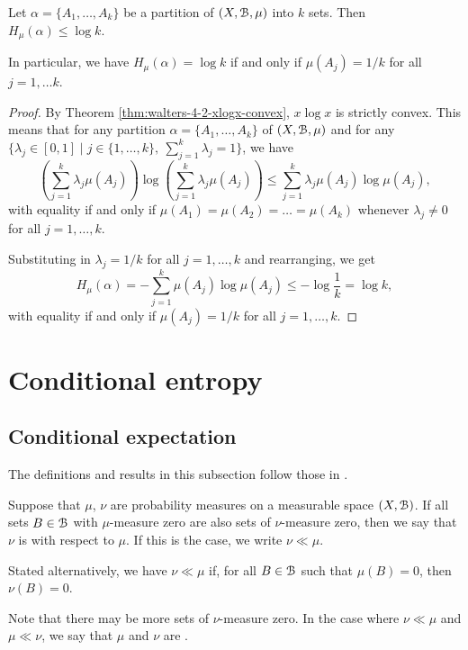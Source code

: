 \begin{proposition} \label{prop:walters-cor-4-2-1}
	Let $\alpha = \{A_1, \dots, A_k\}$ be a partition of $(X, \mathcal{B}, \mu)$ into $k$ sets. Then $H_\mu(\alpha) \leq \log{k}$.
	
	In particular, we have $H_\mu(\alpha) = \log{k}$ if and only if $\mu(A_j) = 1 / k$ for all $j = 1, \dots k$.
	
	\begin{proof}
		By Theorem \ref{thm:walters-4-2-xlogx-convex}, $x \log{x}$ is strictly convex. This means that for any partition $\alpha = \{A_1, \dots, A_k\}$ of $(X, \mathcal{B}, \mu)$ and for any $\{\lambda_j \in [0, 1] \mid j \in \{1, \dots, k\},\ \sum_{j = 1}^k{\lambda_j} = 1\}$, we have
		\[
			\left(\sum_{j = 1}^k{\lambda_j \mu(A_j)}\right) \log{\left(\sum_{j = 1}^k{\lambda_j \mu(A_j)}\right)} \leq \sum_{j = 1}^k{\lambda_j \mu(A_j) \log{\mu(A_j)}},
		\]
		with equality if and only if $\mu(A_1) = \mu(A_2) = \dots = \mu(A_k)$ whenever $\lambda_j \neq 0$ for all $j = 1, \dots, k$.
		
		Substituting in $\lambda_j = 1 / k$ for all $j = 1, \dots, k$ and rearranging, we get
		\[
			H_\mu(\alpha) = -\sum_{j = 1}^k{\mu(A_j) \log{\mu(A_j)}} \leq -\log{\frac{1}{k}} = \log{k},
		\]
		with equality if and only if $\mu(A_j) = 1 / k$ for all $j = 1, \dots, k$.
	\end{proof}
\end{proposition}

\section{Conditional entropy}
\subsection{Conditional expectation}
The definitions and results in this subsection follow those in \cite[p8-9]{walters:intro-to-ergodic-theory}.
\begin{definition}
	Suppose that $\mu$, $\nu$ are probability measures on a measurable space $(X, \mathcal{B})$. If all sets $B \in \mathcal{B}$ with $\mu$-measure zero are also sets of $\nu$-measure zero, then we say that $\nu$ is  with respect to $\mu$. If this is the case, we write $\nu \ll \mu$.
	
	Stated alternatively, we have $\nu \ll \mu$ if, for all $B \in \mathcal{B}$ such that $\mu(B) = 0$, then $\nu(B) = 0$.
	
	Note that there may be more sets of $\nu$-measure zero. In the case where $\nu \ll \mu$ and $\mu \ll \nu$, we say that $\mu$ and $\nu$ are .
\end{definition}

